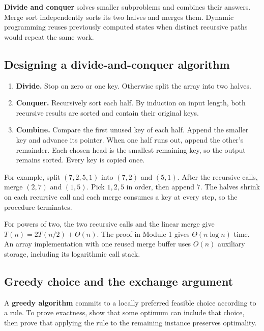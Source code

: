 \documentclass[12pt,a4paper]{article}
\begin{document}
\textbf{Divide and conquer} solves smaller subproblems and combines their answers. Merge sort independently sorts its two halves and merges them. Dynamic programming reuses previously computed states when distinct recursive paths would repeat the same work.

\subsection{Designing a divide-and-conquer algorithm}
\begin{tcolorbox}[examplebox, title={Merge sort from design to correctness proof}]
\begin{enumerate}[leftmargin=*, itemsep=3pt]
  \item \textbf{Divide.} Stop on zero or one key. Otherwise split the array into two halves.
  \item \textbf{Conquer.} Recursively sort each half. By induction on input length, both recursive results are sorted and contain their original keys.
  \item \textbf{Combine.} Compare the first unused key of each half. Append the smaller key and advance its pointer. When one half runs out, append the other's remainder. Each chosen head is the smallest remaining key, so the output remains sorted. Every key is copied once.
\end{enumerate}
{ For example, split $(7,2,5,1)$ into $(7,2)$ and $(5,1)$. After the recursive calls, merge $(2,7)$ and $(1,5)$. Pick $1,2,5$ in order, then append $7$. The halves shrink on each recursive call and each merge consumes a key at every step, so the procedure terminates.\par}
\end{tcolorbox}

For powers of two, the two recursive calls and the linear merge give $T(n)=2T(n/2)+\Theta(n)$. The proof in Module 1 gives $\Theta(n\log n)$ time. An array implementation with one reused merge buffer uses $O(n)$ auxiliary storage, including its logarithmic call stack.

\subsection{Greedy choice and the exchange argument}
\begin{tcolorbox}[defbox, title={Greedy algorithm}]
A \textbf{greedy algorithm} commits to a locally preferred feasible choice according to a rule. To prove exactness, show that some optimum can include that choice, then prove that applying the rule to the remaining instance preserves optimality.
\end{tcolorbox}
\end{document}
